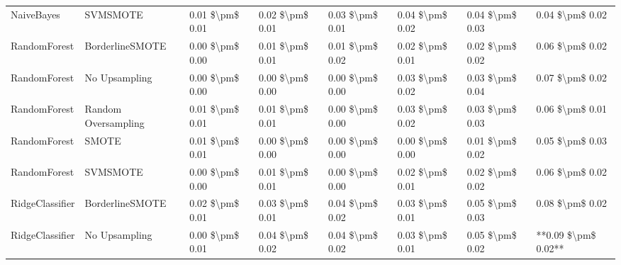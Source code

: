 \begin{tabular}{llllllll}
                     NaiveBayes &                      SVMSMOTE & 0.01 \$\textbackslash pm\$ 0.01 &           0.02 \$\textbackslash pm\$ 0.01 &       0.03 \$\textbackslash pm\$ 0.01 &        0.04 \$\textbackslash pm\$ 0.02 &                         0.04 \$\textbackslash pm\$ 0.03 &     0.04 \$\textbackslash pm\$ 0.02 \\
                   RandomForest &               BorderlineSMOTE & 0.00 \$\textbackslash pm\$ 0.00 &           0.01 \$\textbackslash pm\$ 0.01 &       0.01 \$\textbackslash pm\$ 0.02 &        0.02 \$\textbackslash pm\$ 0.01 &                         0.02 \$\textbackslash pm\$ 0.02 &     0.06 \$\textbackslash pm\$ 0.02 \\
                   RandomForest &                 No Upsampling & 0.00 \$\textbackslash pm\$ 0.00 &           0.00 \$\textbackslash pm\$ 0.00 &       0.00 \$\textbackslash pm\$ 0.00 &        0.03 \$\textbackslash pm\$ 0.02 &                         0.03 \$\textbackslash pm\$ 0.04 &     0.07 \$\textbackslash pm\$ 0.02 \\
                   RandomForest &           Random Oversampling & 0.01 \$\textbackslash pm\$ 0.01 &           0.01 \$\textbackslash pm\$ 0.01 &       0.00 \$\textbackslash pm\$ 0.00 &        0.03 \$\textbackslash pm\$ 0.02 &                         0.03 \$\textbackslash pm\$ 0.03 &     0.06 \$\textbackslash pm\$ 0.01 \\
                   RandomForest &                         SMOTE & 0.01 \$\textbackslash pm\$ 0.01 &           0.00 \$\textbackslash pm\$ 0.00 &       0.00 \$\textbackslash pm\$ 0.00 &        0.00 \$\textbackslash pm\$ 0.00 &                         0.01 \$\textbackslash pm\$ 0.02 &     0.05 \$\textbackslash pm\$ 0.03 \\
                   RandomForest &                      SVMSMOTE & 0.00 \$\textbackslash pm\$ 0.00 &           0.01 \$\textbackslash pm\$ 0.01 &       0.00 \$\textbackslash pm\$ 0.00 &        0.02 \$\textbackslash pm\$ 0.01 &                         0.02 \$\textbackslash pm\$ 0.02 &     0.06 \$\textbackslash pm\$ 0.02 \\
                RidgeClassifier &               BorderlineSMOTE & 0.02 \$\textbackslash pm\$ 0.01 &           0.03 \$\textbackslash pm\$ 0.01 &       0.04 \$\textbackslash pm\$ 0.02 &        0.03 \$\textbackslash pm\$ 0.01 &                         0.05 \$\textbackslash pm\$ 0.03 &     0.08 \$\textbackslash pm\$ 0.02 \\
                RidgeClassifier &                 No Upsampling & 0.00 \$\textbackslash pm\$ 0.01 &           0.04 \$\textbackslash pm\$ 0.02 &       0.04 \$\textbackslash pm\$ 0.02 &        0.03 \$\textbackslash pm\$ 0.01 &                         0.05 \$\textbackslash pm\$ 0.02 & **0.09 \$\textbackslash pm\$ 0.02** \\

\end{tabular}
